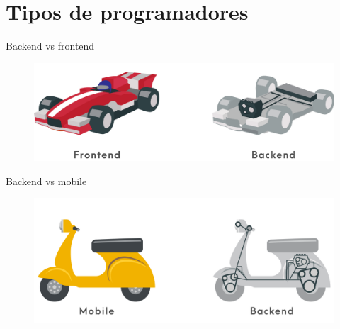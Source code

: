 \documentclass[aspectratio=169]{beamer}
\begin{document}
{
	\section{Tipos de programadores}
}




\begin{frame}{Backend vs frontend}
	\begin{figure}
		\centering
		\includegraphics[width=\linewidth]{Images/backvsfront}
	\end{figure}
\end{frame}



\begin{frame}{Backend vs mobile}
	\begin{figure}
		\centering
		\includegraphics[width=\linewidth]{Images/backvsmobile.png}
	\end{figure}
\end{frame}
\end{document}
